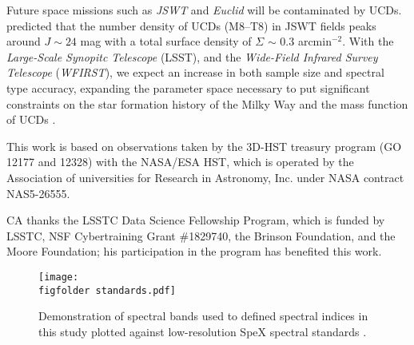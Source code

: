 \documentclass[manuscript]{aastex63}
\begin{document}
Future space missions such as \textit{JSWT} and \textit{Euclid} will be contaminated by UCDs. \cite{2016AJ....151...92R} predicted that the number density of UCDs (M8--T8) in JSWT fields peaks around $J\sim24$ mag with a total surface density of $\Sigma$ $\sim$ 0.3 arcmin$^{-2}$.  With the \textit{Large-Scale Synopitc Telescope} (LSST), and the \textit{Wide-Field Infrared Survey Telescope} (\textit{WFIRST}), we expect an increase in both sample size and spectral type accuracy, expanding the parameter space necessary to put significant constraints on the star formation history of the Milky Way and the mass function of UCDs \citep{LSSTScienceCollaboration2009,Spergel2015}.



\acknowledgements
This work is based on observations taken by the 3D-HST treasury program (GO 12177 and 12328) with the NASA/ESA HST, which is operated by the Association of universities for Research in Astronomy, Inc. under NASA contract NAS5-26555.

CA thanks the LSSTC Data Science Fellowship Program, which is funded by LSSTC, NSF Cybertraining Grant \#1829740, the Brinson Foundation, and the Moore Foundation; his participation in the program has benefited this work.


\clearpage




\newcommand{\figfolder}{./figures/}
\newcommand{\spectrafolder}{./spectra/}


\begin{figure}
    \centering
    \texttt{[image: \\figfolder standards.pdf]}
    \caption{ Demonstration of spectral bands used to defined spectral indices in this study plotted against low-resolution SpeX spectral standards \citep{2010ApJS..190..100K}. }
    \label{fig:indexdefinition}
\end{figure}
\end{document}
